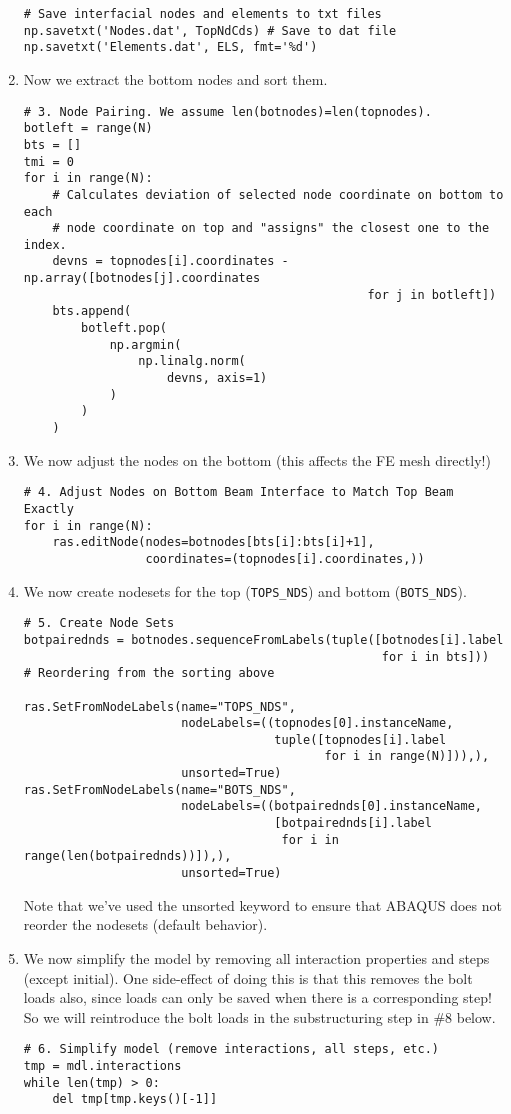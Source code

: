 \documentclass[11pt]{article}
\begin{document}
\begin{enumerate}
\begin{verbatim}
# Save interfacial nodes and elements to txt files
np.savetxt('Nodes.dat', TopNdCds) # Save to dat file
np.savetxt('Elements.dat', ELS, fmt='%d')
\end{verbatim}
\item Now we extract the bottom nodes and sort them.
\begin{verbatim}
# 3. Node Pairing. We assume len(botnodes)=len(topnodes).
botleft = range(N)
bts = []
tmi = 0
for i in range(N):
    # Calculates deviation of selected node coordinate on bottom to each
    # node coordinate on top and "assigns" the closest one to the index.
    devns = topnodes[i].coordinates - np.array([botnodes[j].coordinates
                                                for j in botleft])
    bts.append(
        botleft.pop(
            np.argmin(
                np.linalg.norm(
                    devns, axis=1)
            )
        )
    )
\end{verbatim}
\item We now adjust the nodes on the bottom (this affects the FE mesh directly!)
\begin{verbatim}
# 4. Adjust Nodes on Bottom Beam Interface to Match Top Beam Exactly
for i in range(N):
    ras.editNode(nodes=botnodes[bts[i]:bts[i]+1],
                 coordinates=(topnodes[i].coordinates,))
\end{verbatim}
\item We now create nodesets for the top (\texttt{TOPS\_NDS}) and bottom (\texttt{BOTS\_NDS}).
\begin{verbatim}
# 5. Create Node Sets
botpairednds = botnodes.sequenceFromLabels(tuple([botnodes[i].label
                                                  for i in bts]))
# Reordering from the sorting above

ras.SetFromNodeLabels(name="TOPS_NDS", 
                      nodeLabels=((topnodes[0].instanceName, 
                                   tuple([topnodes[i].label
                                          for i in range(N)])),),
                      unsorted=True)
ras.SetFromNodeLabels(name="BOTS_NDS", 
                      nodeLabels=((botpairednds[0].instanceName, 
                                   [botpairednds[i].label
                                    for i in range(len(botpairednds))]),),
                      unsorted=True)
\end{verbatim}
Note that we've used the unsorted keyword to ensure that ABAQUS does not reorder the nodesets (default behavior).
\item We now simplify the model by removing all interaction properties and steps (except initial).
One side-effect of doing this is that this removes the bolt loads also, since loads can only be saved when there is a corresponding step!
So we will reintroduce the bolt loads in the substructuring step in \#8 below.
\begin{verbatim}
# 6. Simplify model (remove interactions, all steps, etc.)
tmp = mdl.interactions
while len(tmp) > 0:
    del tmp[tmp.keys()[-1]]


\end{verbatim}
\end{enumerate}
\end{document}
